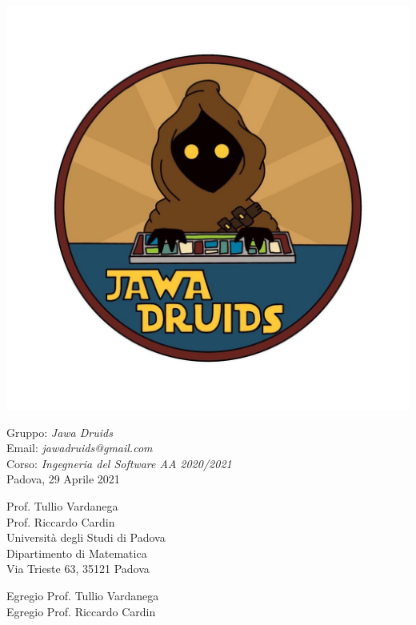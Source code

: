 \documentclass[a4paper,12pt]{report}
\begin{document}
\mbox{}
\vspace{-4cm}
\begin{center}
  \includegraphics[width=0.6\linewidth]{immagini/DRUIDSLOGO.jpg}
\end{center}
Gruppo: \textit{Jawa Druids} \\ Email: \textit{jawadruids@gmail.com}\\ Corso: \textit{Ingegneria del Software AA 2020/2021}\\Padova, 29 Aprile 2021 \\
\begin{flushright}
  Prof. Tullio Vardanega \\
  Prof. Riccardo Cardin \\
  Università degli Studi di Padova \\
  Dipartimento di Matematica \\
  Via Trieste 63, 35121 Padova \\
\end{flushright}
Egregio Prof. Tullio Vardanega \\
Egregio Prof. Riccardo Cardin \\
\vspace{0.2cm}
\end{document}

